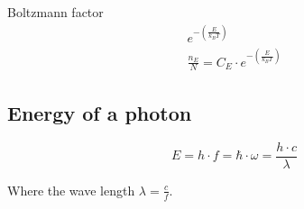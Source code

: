Boltzmann factor
\begin{align}
	e^{-\left(\frac{E}{k_B T}\right)} \\
	\frac{n_E}{N} = C_E \cdot e^{-\left(\frac{E}{k_B T}\right)}
\end{align}

\subsection{Energy of a photon}

\begin{equation}
	E = h \cdot f = \hbar \cdot \omega = \frac{h \cdot c}{\lambda}
\end{equation}

Where the wave length $\lambda = \frac{c}{f}$. 